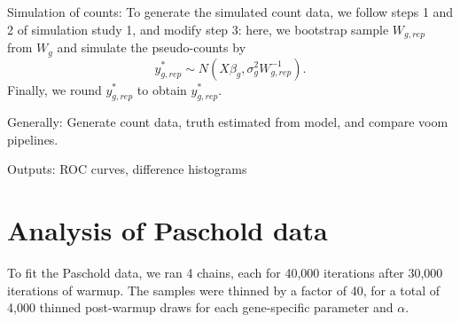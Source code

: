 Simulation of counts:
To generate the simulated count data, we follow steps 1 and 2 of simulation study 1, and modify step 3: here, we bootstrap sample $W_{g,rep}$ from $W_g$ and simulate the pseudo-counts by
$$y^*_{g,rep} \sim N(X\beta_g,\sigma^2_gW_{g,rep}^{-1}).$$
Finally, we round $y^*_{g,rep}$ to obtain $y^*_{g,rep}$.




Generally: Generate count data, truth estimated from model, and compare voom pipelines.

Outputs: ROC curves, difference histograms

\section{Analysis of Paschold data}
To fit the Paschold data, we ran 4 chains, each for 40,000 iterations after 30,000 iterations of warmup. The samples were thinned by a factor of 40, for a total of 4,000 thinned post-warmup draws for each gene-specific parameter and $\alpha$. 



